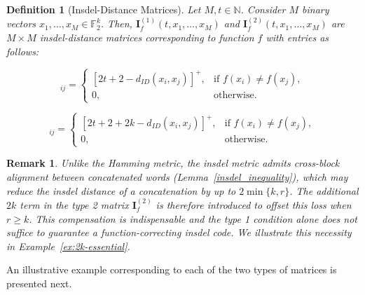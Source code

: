 \documentclass[11 pt]{article}
\numberwithin{equation}{section}
\newtheorem{definition}[theorem]{Definition}
\newtheorem{remark}[theorem]{Remark}
\begin{document}
    \begin{definition}[Insdel-Distance Matrices]
    \label{insdel-matrices} 
    Let $M,t \in \mathbb{N}$. Consider $M$ binary vectors ${x_1}, \ldots, {x_{M}} \in {\mathbb{F}_2^k}$. Then,  ${\textbf{I}_f^{(1)}}(t, {x_1}, \ldots , {x_{M}})$ and
    ${\textbf{I}_f^{(2)}}(t, x_1, \ldots, x_{M})$  are $M \times M$  insdel-distance matrices corresponding to function $f$ with entries as follows:
   
        \begin{equation*}    
        [\mathbf{I}_f^{(1)}(t, x_1,\dots,x_M)]_{ij} =
        \begin{cases}
        [2t + 2 - d_{ID}(x_i,x_j)]^{+}, & \text{if } f(x_i)\neq f(x_j),\\
        0, & \text{otherwise}.
        \end{cases}
    \end{equation*}
    
    

    
    
    \begin{equation*}
    [\mathbf{I}_f^{(2)}(t, x_1,\dots,x_M)]_{ij} =
    \begin{cases}
    [2t + 2 + 2k - d_{ID}(x_i,x_j)]^{+}, & \text{if } f(x_i)\neq f(x_j),\\
    0, & \text{otherwise}.
    \end{cases}
    \end{equation*}   
    \end{definition}
    
    
    \begin{remark}
    \label{rmk:2k-term}
    Unlike the Hamming metric, the insdel metric admits cross-block alignment between concatenated words (Lemma~\ref{insdel_inequality}), which may reduce the insdel distance of a concatenation by up to $2\min\{k, r\}$. The additional $2k$ term in the type 2 matrix $\bm{I}^{(2)}_f$ is therefore introduced to offset this loss when $r \geq k$. This compensation is indispensable and the type 1 condition alone does not suffice to guarantee a function-correcting insdel code. We illustrate this necessity in Example~\ref{ex:2k-essential}.
    \end{remark}
    
    An illustrative example corresponding to each of the two types of matrices is presented next. 
    
\end{document}

